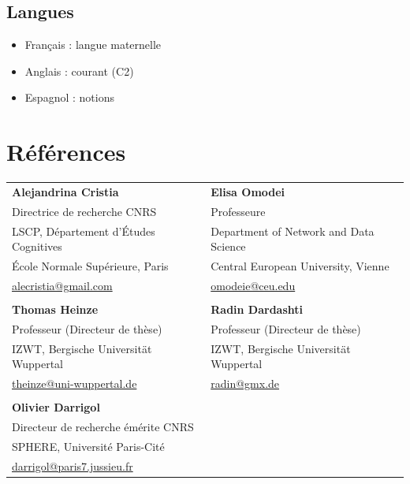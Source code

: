 \documentclass[11pt,a4paper]{article}
\begin{document}
\subsection{Langues}

\begin{itemize}
    \item Français : langue maternelle
    \item Anglais : courant (C2)
    \item Espagnol : notions
\end{itemize}


\section{Références}

\begin{tabular}{@{}p{}p{}@{}}

\textbf{Alejandrina Cristia} & \textbf{Elisa Omodei} \\
Directrice de recherche CNRS & Professeure \\
LSCP, Département d'Études Cognitives & Department of Network and Data Science \\
École Normale Supérieure, Paris & Central European University, Vienne \\
\href{mailto:alecristia@gmail.com}{alecristia@gmail.com} & \href{mailto:omodeie@ceu.edu}{omodeie@ceu.edu} \\
\\
\textbf{Thomas Heinze} & \textbf{Radin Dardashti} \\
Professeur (Directeur de thèse) & Professeur (Directeur de thèse) \\
IZWT, Bergische Universität Wuppertal & IZWT, Bergische Universität Wuppertal \\
\href{mailto:theinze@uni-wuppertal.de}{theinze@uni-wuppertal.de} & \href{mailto:radin@gmx.de}{radin@gmx.de} \\
\\
\textbf{Olivier Darrigol} & \\
Directeur de recherche émérite CNRS & \\
SPHERE, Université Paris-Cité & \\
\href{mailto:darrigol@paris7.jussieu.fr}{darrigol@paris7.jussieu.fr} & \\

\end{tabular}
\end{document}
